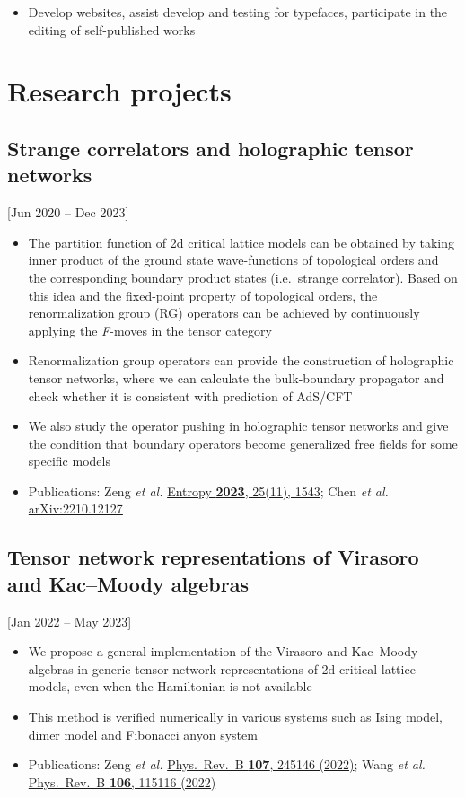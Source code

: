 \documentclass{resume-en}
\begin{document}
\begin{itemize}
  \item Develop websites, assist develop and testing for typefaces, participate in the editing of self-published works
\end{itemize}

\section{Research projects}

\subsection{Strange correlators and holographic tensor networks}[\hfill Jun 2020 -- Dec 2023]

\begin{itemize}
  \item The partition function of 2d critical lattice models can be obtained by taking inner product of the ground state wave-functions of topological orders and the corresponding boundary product states (i.e.\ strange correlator). Based on this idea and the fixed-point property of topological orders, the renormalization group (RG) operators can be achieved by continuously applying the \emph{F}-moves in the tensor category
  \item Renormalization group operators can provide the construction of holographic tensor networks, where we can calculate the bulk-boundary propagator and check whether it is consistent with prediction of AdS/CFT
  \item We also study the operator pushing in holographic tensor networks and give the condition that boundary operators become generalized free fields for some specific models
  \item Publications:
    Zeng \emph{et al.} \href{https://doi.org/10.3390/e25111543}{Entropy \textbf{2023}, 25(11), 1543};\enspace
    Chen \emph{et al.} \href{https://arxiv.org/abs/2210.12127}{arXiv:2210.12127}
\end{itemize}

\subsection{Tensor network representations of Virasoro and Kac--Moody algebras}[\hfill Jan 2022 -- May 2023]

\begin{itemize}
  \item We propose a general implementation of the Virasoro and Kac--Moody algebras in generic tensor network representations of 2d critical lattice models, even when the Hamiltonian is not available
  \item This method is verified numerically in various systems such as Ising model, dimer model and Fibonacci anyon system
  \item Publications:
    Zeng \emph{et al.} \href{https://doi.org/10.1103/PhysRevB.107.245146}{Phys.\ Rev.\ B \textbf{107}, 245146 (2022)};\enspace
    Wang \emph{et al.} \href{https://doi.org/10.1103/PhysRevB.106.115116}{Phys.\ Rev.\ B \textbf{106}, 115116 (2022)}
\end{itemize}
\end{document}
